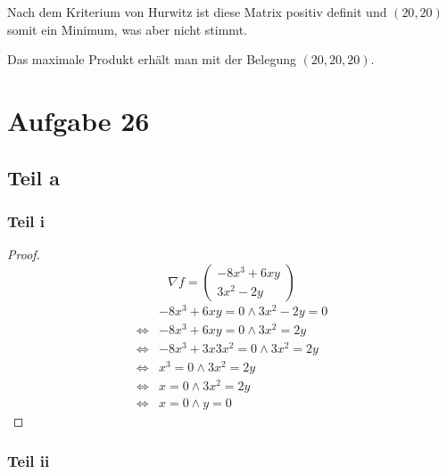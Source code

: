 \documentclass[10pt,a4paper]{article}
\begin{document}
Nach dem Kriterium von Hurwitz ist diese Matrix positiv definit und $(20, 20)$ somit ein Minimum, was aber nicht stimmt.

Das maximale Produkt erhält man mit der Belegung $(20, 20, 20)$.

\section*{Aufgabe 26}

\subsection*{Teil a}

\subsubsection*{Teil i}

\begin{proof}
\begin{equation}
\nabla f = \begin{pmatrix}
-8x^{3} + 6xy\\
3x^{2} - 2y
\end{pmatrix}
\end{equation}
\begin{align*}
& -8x^{3} + 6xy = 0 \land 3x^{2} - 2y = 0\\
\Leftrightarrow & -8x^{3} + 6xy = 0 \land 3x^{2} = 2y\\
\Leftrightarrow & -8x^{3} + 3x3x^{2} = 0 \land 3x^{2} = 2y\\
\Leftrightarrow & x^{3} = 0 \land 3x^{2} = 2y\\
\Leftrightarrow & x = 0 \land 3x^{2} = 2y\\
\Leftrightarrow & x = 0 \land y = 0
\end{align*}
\end{proof}

\subsubsection*{Teil ii}
\end{document}
